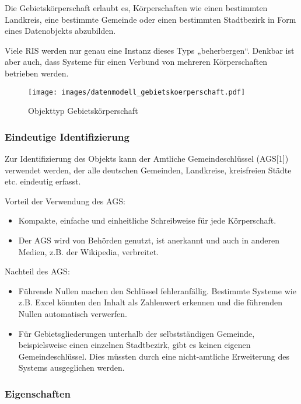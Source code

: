 \documentclass[,a4paper]{article}
\makeatletter
\def\maxwidth{\ifdim\Gin@nat@width>\linewidth\linewidth
\else\Gin@nat@width\fi}
\let\Oldincludegraphics\includegraphics
\renewcommand{\includegraphics}[1]{\Oldincludegraphics[width=\maxwidth]{#1}}
\makeatother
\begin{document}
Die Gebietskörperschaft erlaubt es, Körperschaften wie einen bestimmten
Landkreis, eine bestimmte Gemeinde oder einen bestimmten Stadtbezirk in
Form eines Datenobjekts abzubilden.

Viele RIS werden nur genau eine Instanz dieses Typs „beherbergen``.
Denkbar ist aber auch, dass Systeme für einen Verbund von mehreren
Körperschaften betrieben werden.

\begin{figure}[htbp]
\centering
\texttt{[image: images/datenmodell\_gebietskoerperschaft.pdf]}
\caption{Objekttyp Gebietskörperschaft}
\end{figure}

\subsubsection{Eindeutige Identifizierung}

Zur Identifizierung des Objekts kann der Amtliche Gemeindeschlüssel
(AGS{[}1{]}) verwendet werden, der alle deutschen Gemeinden, Landkreise,
kreisfreien Städte etc. eindeutig erfasst.

Vorteil der Verwendung des AGS:

\begin{itemize}
\item
  Kompakte, einfache und einheitliche Schreibweise für jede
  Körperschaft.
\item
  Der AGS wird von Behörden genutzt, ist anerkannt und auch in anderen
  Medien, z.B. der Wikipedia, verbreitet.
\end{itemize}

Nachteil des AGS:

\begin{itemize}
\item
  Führende Nullen machen den Schlüssel fehleranfällig. Bestimmte Systeme
  wie z.B. Excel könnten den Inhalt als Zahlenwert erkennen und die
  führenden Nullen automatisch verwerfen.
\item
  Für Gebietsgliederungen unterhalb der selbstständigen Gemeinde,
  beispielsweise einen einzelnen Stadtbezirk, gibt es keinen eigenen
  Gemeindeschlüssel. Dies müssten durch eine nicht-amtliche Erweiterung
  des Systems ausgeglichen werden.
\end{itemize}

\subsubsection{Eigenschaften}
\end{document}

